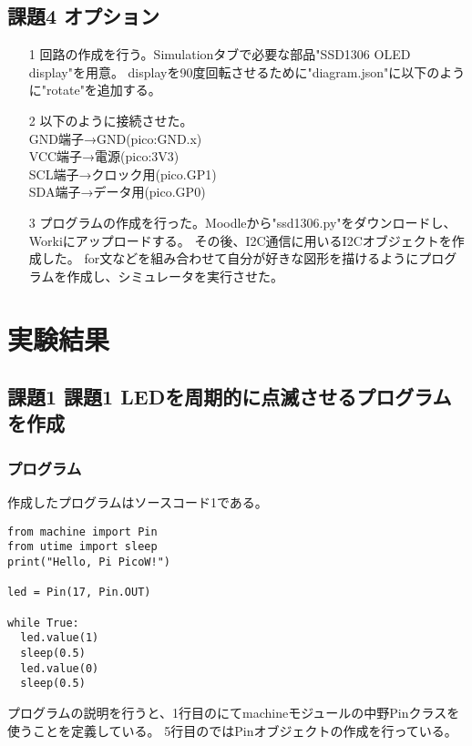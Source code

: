 \documentclass[dvipdfmx]{jsarticle}
\begin{document}
\subsection{課題4 オプション}\label{sec:2}
\begin{itemize}
  \item[1] 回路の作成を行う。Simulationタブで必要な部品"SSD1306 OLED display"を用意。
  displayを90度回転させるために"diagram.json"に以下のように"rotate"を追加する。

  \item[2] 以下のように接続させた。\\
  GND端子→GND(pico:GND.x)\\
  VCC端子→電源(pico:3V3)\\
  SCL端子→クロック用(pico.GP1)\\
  SDA端子→データ用(pico.GP0)\\
  \item[3] プログラムの作成を行った。Moodleから"ssd1306.py"をダウンロードし、Workiにアップロードする。
  その後、I2C通信に用いるI2Cオブジェクトを作成した。
  for文などを組み合わせて自分が好きな図形を描けるようにプログラムを作成し、シミュレータを実行させた。
\end{itemize}

\section{実験結果}
\subsection{課題1 課題1 LEDを周期的に点滅させるプログラムを作成}
\subsubsection{プログラム}
作成したプログラムはソースコード1である。\\
\begin{lstlisting}[caption={main.py}]
from machine import Pin
from utime import sleep
print("Hello, Pi PicoW!")

led = Pin(17, Pin.OUT)

while True:
  led.value(1)
  sleep(0.5)
  led.value(0)
  sleep(0.5)
\end{lstlisting}
\vspace*{3mm}
プログラムの説明を行うと、1行目のにてmachineモジュールの中野Pinクラスを使うことを定義している。
5行目のではPinオブジェクトの作成を行っている。
\end{document}

